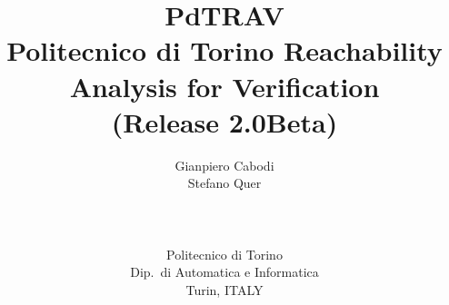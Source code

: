 
\setlength{\textheight}{8.75in}
\setlength{\textwidth}{7.0in}
\setlength{\footheight}{0.0in}
\setlength{\topmargin}{0.25in}
\setlength{\headheight}{0.0in}
\setlength{\headsep}{0.0in}
\setlength{\oddsidemargin}{-.35in}
\setlength{\parskip}{1ex plus .2ex minus .2ex}
\setlength{\parindent}{0pc}
\setcounter{topnumber}{5}
\setcounter{dbltopnumber}{5}

\newcommand{\GpC}[1]{{\bf GpC: #1 \\}}
\newcommand{\StQ}[1]{{\bf StQ: #1 \\}}

\title{\Large\bf
PdTRAV \\
Politecnico di Torino Reachability Analysis for Verification \\
(Release 2.0Beta)
}

\author{
\parbox{1.5in}{\begin{center}
               Gianpiero Cabodi
               \end{center}}
\parbox{1.5in}{\begin{center}
               Stefano Quer
               \end{center}}
\\~\\
\parbox{3in}{\begin{center}
             Politecnico di Torino \\
             Dip.\ di Automatica e Informatica \\
             Turin, ITALY
             \end{center}}
}




\maketitle
\thispagestyle{empty}
\small


\newpage

\setcounter{page}{1}
\normalsize
\tableofcontents

\newpage


